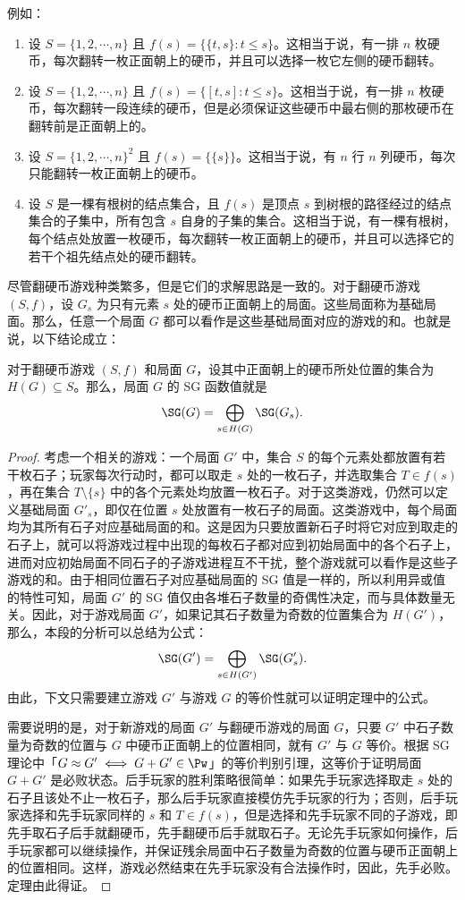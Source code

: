 例如：
\begin{enumerate}
	\item 设 $S=\{1,2,\cdots,n\}$ 且 $f(s)=\{\{t,s\}:t \le s\}$。这相当于说，有一排 $n$ 枚硬币，每次翻转一枚正面朝上的硬币，并且可以选择一枚它左侧的硬币翻转。
	\item 设 $S=\{1,2,\cdots,n\}$ 且 $f(s)=\{[t,s]:t \le s\}$。这相当于说，有一排 $n$ 枚硬币，每次翻转一段连续的硬币，但是必须保证这些硬币中最右侧的那枚硬币在翻转前是正面朝上的。
	\item 设 $S=\{1,2,\cdots,n\}^2$ 且 $f(s)=\{\{s\}\}$。这相当于说，有 $n$ 行 $n$ 列硬币，每次只能翻转一枚正面朝上的硬币。
	\item 设 $S$ 是一棵有根树的结点集合，且 $f(s)$ 是顶点 $s$ 到树根的路径经过的结点集合的子集中，所有包含 $s$ 自身的子集的集合。这相当于说，有一棵有根树，每个结点处放置一枚硬币，每次翻转一枚正面朝上的硬币，并且可以选择它的若干个祖先结点处的硬币翻转。
\end{enumerate}

尽管翻硬币游戏种类繁多，但是它们的求解思路是一致的。对于翻硬币游戏 $(S,f)$，设 $G_s$ 为只有元素 $s$ 处的硬币正面朝上的局面。这些局面称为基础局面。那么，任意一个局面 $G$ 都可以看作是这些基础局面对应的游戏的和。也就是说，以下结论成立：

\begin{theorem}
	对于翻硬币游戏 $(S,f)$ 和局面 $G$，设其中正面朝上的硬币所处位置的集合为 $H(G)\subseteq S$。那么，局面 $G$ 的 SG 函数值就是
	$$\SG(G) = \bigoplus_{s\in H(G)}\SG(G_s).$$
\end{theorem}

\begin{proof}
	考虑一个相关的游戏：一个局面 $G'$ 中，集合 $S$ 的每个元素处都放置有若干枚石子；玩家每次行动时，都可以取走 $s$ 处的一枚石子，并选取集合 $T\in f(s)$，再在集合 $T\setminus\{s\}$ 中的各个元素处均放置一枚石子。对于这类游戏，仍然可以定义基础局面 $G'_s$，即仅在位置 $s$ 处放置有一枚石子的局面。这类游戏中，每个局面均为其所有石子对应基础局面的和。这是因为只要放置新石子时将它对应到取走的石子上，就可以将游戏过程中出现的每枚石子都对应到初始局面中的各个石子上，进而对应初始局面不同石子的子游戏进程互不干扰，整个游戏就可以看作是这些子游戏的和。由于相同位置石子对应基础局面的 SG 值是一样的，所以利用异或值的特性可知，局面 $G'$ 的 SG 值仅由各堆石子数量的奇偶性决定，而与具体数量无关。因此，对于游戏局面 $G'$，如果记其石子数量为奇数的位置集合为 $H(G')$，那么，本段的分析可以总结为公式：
	$$
	\SG(G') = \bigoplus_{s\in H(G')} \SG(G'_s).
	$$
	由此，下文只需要建立游戏 $G'$ 与游戏 $G$ 的等价性就可以证明定理中的公式。
	
	需要说明的是，对于新游戏的局面 $G'$ 与翻硬币游戏的局面 $G$，只要 $G'$ 中石子数量为奇数的位置与 $G$ 中硬币正面朝上的位置相同，就有 $G'$ 与 $G$ 等价。根据 SG 理论中「$G\approx G'\iff G+G'\in\Pw$」的等价判别引理，这等价于证明局面 $G+G'$ 是必败状态。后手玩家的胜利策略很简单：如果先手玩家选择取走 $s$ 处的石子且该处不止一枚石子，那么后手玩家直接模仿先手玩家的行为；否则，后手玩家选择和先手玩家同样的 $s$ 和 $T\in f(s)$，但是选择和先手玩家不同的子游戏，即先手取石子后手就翻硬币，先手翻硬币后手就取石子。无论先手玩家如何操作，后手玩家都可以继续操作，并保证残余局面中石子数量为奇数的位置与硬币正面朝上的位置相同。这样，游戏必然结束在先手玩家没有合法操作时，因此，先手必败。定理由此得证。
\end{proof}

